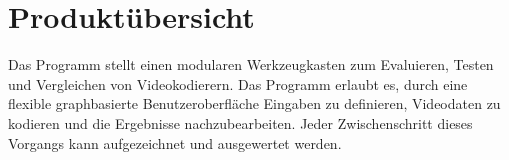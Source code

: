 \section{Produktübersicht}

Das Programm stellt einen modularen Werkzeugkasten zum Evaluieren, Testen und Vergleichen von Videokodierern. Das Programm erlaubt es, durch eine flexible graphbasierte Benutzeroberfläche Eingaben zu definieren, Videodaten zu kodieren und die Ergebnisse nachzubearbeiten. Jeder Zwischenschritt dieses Vorgangs kann aufgezeichnet und ausgewertet werden.
